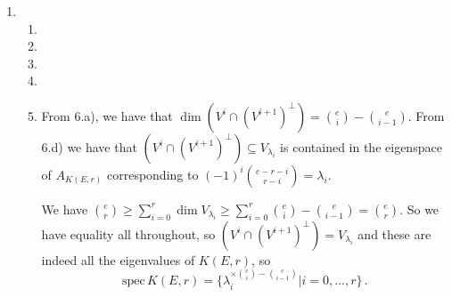 \documentclass[kulak]{tplt}
\theoremstyle{definition}
\newcommand{\spec}{\mathrm{spec}}
\begin{document}
\begin{enumerate}
\begin{verbatim}
      [0, 0, 0, 0, 1, 0, 1, 1, 0, 0]]

sorted(list(np.round(np.linalg.eig(np.array(A_P))[0])))

>> [-2.0, -2.0, -2.0, -2.0, 1.0, 1.0, 1.0, 1.0, 1.0, 3.0]
\end{verbatim}

\item 
\begin{enumerate}
\item 

\item 

\item 

\item

\item 
From 6.a), we have that $\dim (V^i \cap (V^{i+1})^{\perp}) = \binom{e}{i}-\binom{e}{i-1}$.
From 6.d) we have that $(V^i \cap (V^{i+1})^{\perp}) \subseteq V_{\lambda_i}$ is contained in the eigenspace of $A_{K(E, r)}$ corresponding to $(-1)^i\binom{e-r-i}{r-i} = \lambda_i$.

We have $\binom{e}{r} \geq \sum_{i=0}^r \dim V_{\lambda_i} \geq \sum_{i=0}^r \binom{e}{i}-\binom{e}{i-1} = \binom{e}{r}$.
So we have equality all throughout, so $(V^i \cap (V^{i+1})^{\perp}) = V_{\lambda_i}$ and these are indeed all the eigenvalues of $K(E, r)$, so
$$\spec \, K(E, r) = \{  \lambda_i^{\times \binom{e}{i} - \binom{e}{i-1}} | i = 0, \ldots, r\} \, . $$
\end{enumerate}

\end{enumerate}
\end{document}
